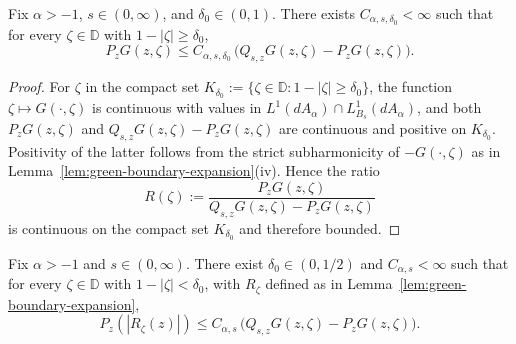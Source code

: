 \documentclass[a4paper,10pt]{amsart}
\newcommand{\D}{\mathbb{D}}
\begin{document}
\begin{numlemma}\label{lem:interior-green-gap}
Fix $\alpha>-1$, $s\in(0,\infty)$, and $\delta_0\in(0,1)$.  There exists
$C_{\alpha,s,\delta_0}<\infty$ such that for every $\zeta\in\D$ with
$1-|\zeta|\ge\delta_0$,
\[
P_zG(z,\zeta)
\le
C_{\alpha,s,\delta_0}\,
\bigl(Q_{s,z}G(z,\zeta)-P_zG(z,\zeta)\bigr).
\]
\end{numlemma}

\begin{proof}
For $\zeta$ in the compact set
$K_{\delta_0}:=\{\zeta\in\D:1-|\zeta|\ge\delta_0\}$, the function
$\zeta\mapsto G(\cdot,\zeta)$ is continuous with values in
$L^1(dA_\alpha)\cap L^1_{B_s}(dA_\alpha)$, and both
$P_zG(z,\zeta)$ and $Q_{s,z}G(z,\zeta)-P_zG(z,\zeta)$ are continuous and
positive on $K_{\delta_0}$.  Positivity of the latter follows from the strict
subharmonicity of $-G(\cdot,\zeta)$ as in Lemma~\ref{lem:green-boundary-expansion}(iv).
Hence the ratio
\[
R(\zeta):=
\frac{P_zG(z,\zeta)}
{Q_{s,z}G(z,\zeta)-P_zG(z,\zeta)}
\]
is continuous on the compact set $K_{\delta_0}$ and therefore bounded.
\end{proof}


\begin{numlemma}\label{lem:boundary-remainder-control}
Fix $\alpha>-1$ and $s\in(0,\infty)$.  There exist $\delta_0\in(0,1/2)$
and $C_{\alpha,s}<\infty$ such that for every $\zeta\in\D$ with
$1-|\zeta|<\delta_0$, with $R_\zeta$ defined as in
Lemma~\ref{lem:green-boundary-expansion},
\[
P_z(|R_\zeta(z)|)
\le
C_{\alpha,s}\,
\bigl(Q_{s,z}G(z,\zeta)-P_zG(z,\zeta)\bigr).
\]
\end{numlemma}
\end{document}
